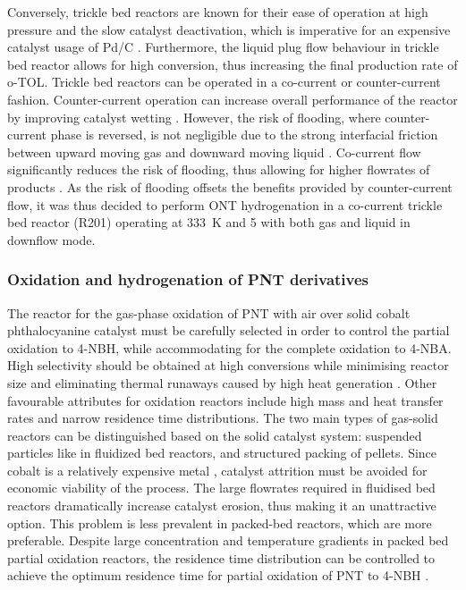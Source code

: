 Conversely, trickle bed reactors are known for their ease of operation at high pressure and the slow catalyst deactivation, which is imperative for an expensive catalyst usage of Pd/C \cite{vemala_hydrodynamic_nodate}. Furthermore, the liquid plug flow behaviour in trickle bed reactor allows for high conversion, thus increasing the final production rate of o-TOL. Trickle bed reactors can be operated in a co-current or counter-current fashion. Counter-current operation can increase overall performance of the reactor by improving catalyst wetting \cite{kundu_novel_2003}. However, the risk of flooding, where counter-current phase is reversed, is not negligible due to the strong interfacial friction between upward moving gas and downward moving liquid \cite{breijer_prevention_2008}. Co-current flow significantly reduces the risk of flooding, thus allowing for higher flowrates of products \cite{vemala_hydrodynamic_nodate}. As the risk of flooding offsets the benefits provided by counter-current flow, it was thus decided to perform ONT hydrogenation in a co-current trickle bed reactor (R201) operating at \SI{333}{\K} and \SI{5}{\atm} with both gas and liquid in downflow mode. 


\subsubsection{Oxidation and hydrogenation of PNT derivatives} \label{sec:synthesis-R3-R4}

The reactor for the gas-phase oxidation of PNT with air over solid cobalt phthalocyanine catalyst must be carefully selected in order to control the partial oxidation to 4-NBH, while accommodating for the complete oxidation to 4-NBA. High selectivity should be obtained at high conversions while minimising reactor size and eliminating thermal runaways caused by high heat generation \cite{schmidt_catalytic_1994}. Other favourable attributes for oxidation reactors include high mass and heat transfer rates and narrow residence time distributions. The two main types of gas-solid reactors can be distinguished based on the solid catalyst system: suspended particles like in fluidized bed reactors, and structured packing of pellets. Since cobalt is a relatively expensive metal \cite{saib_fundamental_2014}, catalyst attrition must be avoided for economic viability of the process. The large flowrates required in fluidised bed reactors dramatically increase catalyst erosion, thus making it an unattractive option. This problem is less prevalent in packed-bed reactors, which are more preferable. Despite large concentration and temperature gradients in packed bed partial oxidation reactors, the residence time distribution can be controlled to achieve the optimum residence time for partial oxidation of PNT to 4-NBH \cite{schmidt_catalytic_1994}.


